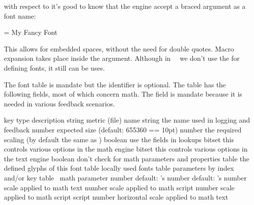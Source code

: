 with respect to \type {\font} it's good to know that the engine accept a braced
argument as a font name:

\starttyping[option=TEX]
\font\myfont = {My Fancy Font}
\stoptyping

This allows for embedded spaces, without the need for double quotes. Macro
expansion takes place inside the argument. Although in \CONTEXT\ \LMTX\ we don't
use the \type {\font} for defining fonts, it still can be uses.

The font table is mandate but the identifier is optional. The table has the
following fields, most of which concern math. The  field is mandate
because it is needed in various feedback scenarios.


\starttabulate[|l|l|pl|]
\FL
\BC key                        \BC type    \BC description \NC \NR
\ML
\NC {}               \NC string  \NC metric (file) name \NC \NR
\NC {}           \NC string  \NC the name used in logging and feedback \NC \NR
\NC {}         \NC number  \NC expected size (default: 655360 == 10pt) \NC \NR
\NC {}               \NC number  \NC the required scaling (by default the same as ) \NC \NR
\HL
\NC {}        \NC boolean \NC use the  fields in lookups        \NC \NR
\NC {}        \NC bitset  \NC this controls various options in the math engine \NC \NR
\NC {}        \NC bitset  \NC this controls various options in the text engine \NC \NR
\NC {}             \NC boolean \NC don't check for math parameters and properties   \NC \NR
\HL
\NC {}         \NC table   \NC the defined glyphs of this font \NC \NR
\NC {}              \NC table   \NC locally used fonts              \NC \NR
\NC {}         \NC table   \NC parameters by index and/or key  \NC \NR
\NC {}      \NC table   \NC \OPENTYPE\ math parameter       \NC \NR
\HL
\NC {}         \NC number  \NC default: \TEX's \type {\hyphenchar} \NC \NR
\NC {}           \NC number  \NC default: \TEX's \type {\skewchar}   \NC \NR
\HL
\NC {}          \NC number  \NC scale applied to math text          \NC \NR
\NC {}        \NC number  \NC scale applied to math script        \NC \NR
\NC {}  \NC number  \NC scale applied to math script script \NC \NR
\HL
\NC {}         \NC number  \NC horizontal scale applied to math text          \NC \NR
